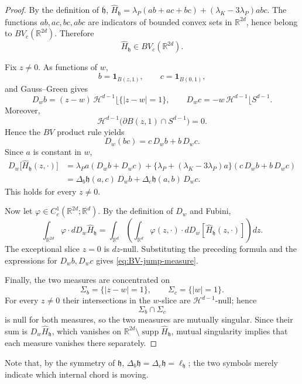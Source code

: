 \documentclass[11pt]{article}
\theoremstyle{remark}
\newcommand{\R}{\mathbb R}
\newcommand{\ind}{\mathbf 1}
\numberwithin{equation}{section}
\begin{document}
\begin{proof}
By the definition of $\overline{\mathfrak h}$,
$\widehat H_{\mathfrak h}
=
\lambda_P(ab+ac+bc)
+
(\lambda_K-3\lambda_P)abc$.
The functions $ab,ac,bc,abc$ are indicators of bounded convex sets in
$\R^{2d}$, hence belong to $BV_c(\R^{2d})$.  Therefore
\[
\widehat H_{\mathfrak h}\in BV_c(\R^{2d}).
\]

Fix $z\ne0$.  As functions of $w$,
\[
b=\ind_{B(z,1)},\qquad c=\ind_{B(0,1)},
\]
and Gauss--Green gives
\[
D_wb
=
(z-w)\,
\mathcal H^{d-1}\lfloor\{|z-w|=1\},
\qquad
D_wc
=
-w\,
\mathcal H^{d-1}\lfloor S^{d-1}.
\]
Moreover,
\[
\mathcal H^{d-1}
\bigl(\partial B(z,1)\cap S^{d-1}\bigr)=0.
\]
Hence the $BV$ product rule yields
\[
D_w(bc)=c\,D_wb+b\,D_wc.
\]
Since $a$ is constant in $w$,
\[
\begin{aligned}
D_w\bigl[\widehat H_{\mathfrak h}(z,\cdot)\bigr]
&=
\lambda_Pa(D_wb+D_wc)
+
\{\lambda_P+(\lambda_K-3\lambda_P)a\}
(c\,D_wb+b\,D_wc) \\
&=
\Delta_b\mathfrak h(a,c)\,D_wb
+
\Delta_c\mathfrak h(a,b)\,D_wc.
\end{aligned}
\]
This holds for every $z\ne0$.

Now let $\varphi\in C_c^1(\R^{2d};\R^d)$.  By the definition of
$D_w$ and Fubini,
\[
\int_{\R^{2d}}\varphi\cdot dD_w\widehat H_{\mathfrak h}
=
\int_{\R^d}
\left(
\int_{\R^d}
\varphi(z,\cdot)\cdot
dD_w[\widehat H_{\mathfrak h}(z,\cdot)]
\right)dz.
\]
The exceptional slice $z=0$ is $dz$-null.  Substituting the preceding
formula and the expressions for $D_wb,D_wc$ gives
\eqref{eq:BV-jump-measure}.

Finally, the two measures are concentrated on
\[
\Sigma_b=\{|z-w|=1\},
\qquad
\Sigma_c=\{|w|=1\}.
\]
For every $z\ne0$ their intersections in the $w$-slice are
$\mathcal H^{d-1}$-null; hence
\[
\Sigma_b\cap\Sigma_c
\]
is null for both measures, so the two measures are mutually singular.
Since their sum is $D_w\widehat H_{\mathfrak h}$, which vanishes on
$\R^{2d}\setminus\operatorname{supp}\widehat H_{\mathfrak h}$,
mutual singularity implies that each measure vanishes there separately.
\end{proof}
Note that, by the symmetry of $\mathfrak h$,
$\Delta_b\mathfrak h=\Delta_c\mathfrak h=\ell_{\mathfrak h}$; the two
symbols merely indicate which internal chord is moving.
\end{document}
